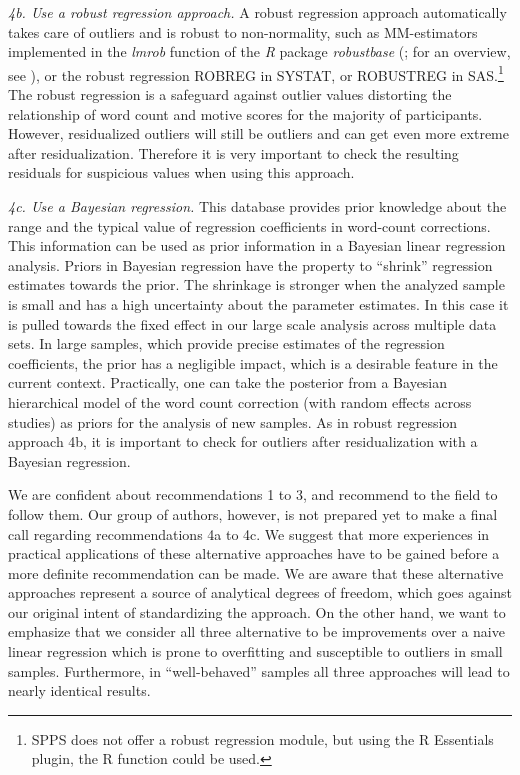 \documentclass[man,a4paper,mask]{apa6}
\begin{document}
{\emph{4b. Use a robust regression approach.}
A robust regression approach automatically takes care of outliers and is robust to non-normality, such as MM-estimators implemented in the \emph{lmrob} function of the \emph{R} package \emph{robustbase} (; for an overview, see ), or the robust regression ROBREG in SYSTAT, or ROBUSTREG in SAS.\footnote{SPPS does not offer a robust regression module, but using the R Essentials plugin, the R function could be used.} The robust regression is a safeguard against outlier values distorting the relationship of word count and motive scores for the majority of participants. However, residualized outliers will still be outliers and can get even more extreme after residualization. Therefore it is very important to check the resulting residuals for suspicious values when using this approach.

\emph{4c. Use a Bayesian regression.} This database provides prior knowledge about the range and the typical value of regression coefficients in word-count corrections. This information can be used as prior information in a Bayesian linear regression analysis. Priors in Bayesian regression have the property to ``shrink'' regression estimates towards the prior. The shrinkage is stronger when the analyzed sample is small and has a high uncertainty about the parameter estimates. In this case it is pulled towards the fixed effect in our large scale analysis across multiple data sets. In large samples, which provide precise estimates of the regression coefficients, the prior has a negligible impact, which is a desirable feature in the current context. 
Practically, one can take the posterior from a Bayesian hierarchical model of the word count correction (with random effects across studies) as priors for the analysis of new samples. 
As in robust regression approach 4b, it is important to check for outliers after residualization with a Bayesian regression.


We are confident about recommendations 1 to 3, and recommend to the field to follow them. Our group of authors, however, is not prepared yet to make a final call regarding recommendations 4a to 4c. We suggest that more experiences in practical applications of these alternative approaches have to be gained before a more definite recommendation can be made. We are aware that these alternative approaches represent a source of analytical degrees of freedom, which goes against our original intent of standardizing the approach. On the other hand, we want to emphasize that we consider all three alternative to be improvements over a naive linear regression which is prone to overfitting and susceptible to outliers in small samples. Furthermore, in ``well-behaved'' samples all three approaches will lead to nearly identical results.

}
\end{document}
